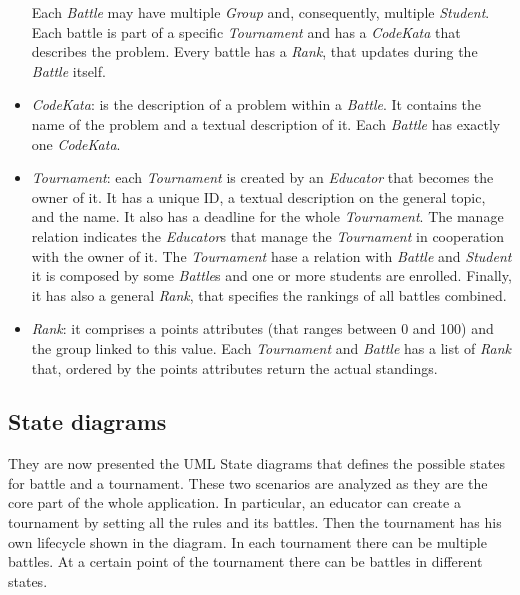 \documentclass[12pt, a4paper]{report}
\begin{document}
\begin{itemize}
            Each \textit{Battle} may have multiple \textit{Group} and, consequently, multiple \textit{Student}. 
            Each battle is part of a specific \textit{Tournament} and has a \textit{CodeKata} that describes the problem. 
            Every battle has a \textit{Rank}, that updates during the \textit{Battle} itself. 
        \item \textit{CodeKata}: is the description of a problem within a \textit{Battle}. 
            It contains the name of the problem and a textual description of it. 
            Each \textit{Battle} has exactly one \textit{CodeKata}. 
        \item \textit{Tournament}: each \textit{Tournament} is created by an \textit{Educator} that becomes the owner of it. 
            It has a unique ID, a textual description on the general topic, and the name. 
            It also has a deadline for the whole \textit{Tournament}. 
            The manage relation indicates the \textit{Educator}s that manage the \textit{Tournament} in cooperation with the owner of it. 
            The \textit{Tournament} hase a relation with \textit{Battle} and \textit{Student} it is composed by some \textit{Battle}s and one or more students are enrolled. 
            Finally, it has also a general \textit{Rank}, that specifies the rankings of all battles combined. 
        \item \textit{Rank}: it comprises a points attributes (that ranges between 0 and 100) and the group linked to this value. 
            Each \textit{Tournament} and \textit{Battle} has a list of \textit{Rank} that, ordered by the points attributes return the actual standings. 
    \end{itemize}

    \subsection{State diagrams}
    They are now presented the UML State diagrams that defines the possible states for battle and a tournament. 
    These two scenarios are analyzed as they are the core part of the whole application.
    In particular, an educator can create a tournament by setting all the rules and its battles. 
    Then the tournament has his own lifecycle shown in the diagram. 
    In each tournament there can be multiple battles. 
    At a certain point of the tournament there can be battles in different states. 
    
\end{document}
